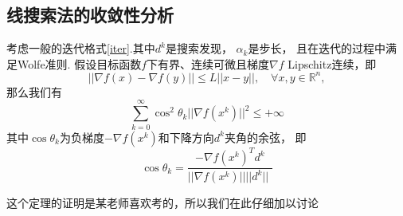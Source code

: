 \subsection{线搜索法的收敛性分析}
\begin{theorem}[Zoutendijk]
	考虑一般的迭代格式\eqref{iter}.其中$d^k$是搜索发现， $\alpha_k$是步长， 且在迭代的过程中满足Wolfe准则. 假设目标函数$f$下有界、连续可微且梯度$\nabla f$ Lipschitz连续，即
	\begin{equation*}
		||\nabla f(x) - \nabla f(y)||\leq L||x-y||,\quad \forall x, y \in \mathbb{R}^n,
	\end{equation*}
	那么我们有
	\begin{equation*}
		\sum\limits_{k=0}^\infty \cos^2\theta_k ||\nabla f(x^k)||^2\leq +\infty
	\end{equation*}
	其中$\cos\theta_k$为负梯度$-\nabla f(x^k)$和下降方向$d^k$夹角的余弦， 即
	\begin{equation*}
		\cos\theta_k = \frac{-\nabla f(x^k)^Td^k}{||\nabla f(x^k)||||d^k|| }
	\end{equation*}
\end{theorem}
这个定理的证明是某老师喜欢考的，所以我们在此仔细加以讨论
